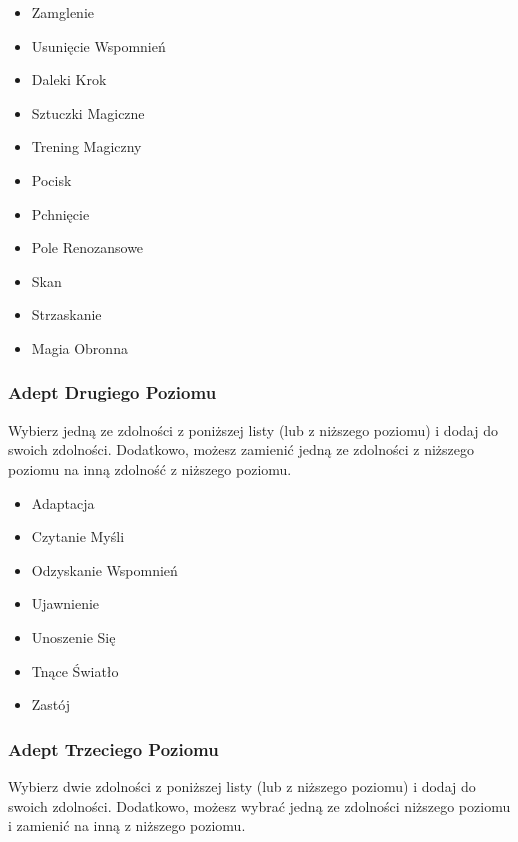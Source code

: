 \begin{itemize}
\item Zamglenie
\item Usunięcie Wspomnień
\item Daleki Krok
\item Sztuczki Magiczne
\item Trening Magiczny
\item Pocisk
\item Pchnięcie
\item Pole Renozansowe
\item Skan
\item Strzaskanie
\item Magia Obronna
\end{itemize}

\subsubsection{Adept Drugiego Poziomu}

Wybierz jedną ze zdolności z poniższej listy (lub z niższego poziomu) i dodaj do swoich zdolności. Dodatkowo, możesz zamienić jedną ze zdolności z niższego poziomu na inną zdolność z niższego poziomu.

\begin{itemize}
\item Adaptacja
\item Czytanie Myśli
\item Odzyskanie Wspomnień
\item Ujawnienie
\item Unoszenie Się
\item Tnące Światło
\item Zastój
\end{itemize}

\subsubsection{Adept Trzeciego Poziomu}

Wybierz dwie zdolności z poniższej listy (lub z niższego poziomu) i dodaj do swoich zdolności. Dodatkowo, możesz wybrać jedną ze zdolności niższego poziomu i zamienić na inną z niższego poziomu. 
